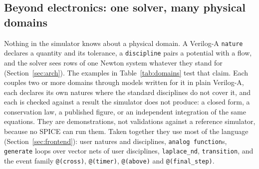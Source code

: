 \subsection{Beyond electronics: one solver, many physical domains}
\label{sec:domains}

Nothing in the simulator knows about a physical domain. A Verilog-A \texttt{nature} declares a
quantity and its tolerance, a \texttt{discipline} pairs a potential with a flow, and the solver
sees rows of one Newton system whatever they stand for (Section~\ref{sec:arch}). The
examples in Table~\ref{tab:domains} test that claim. Each couples two or more domains through
models written for it in plain Verilog-A, each declares its own natures where the standard
disciplines do not cover it, and each is checked against a result the simulator does not
produce: a closed form, a conservation law, a published figure, or an independent integration
of the same equations. They are demonstrations, not validations against a reference simulator,
because no SPICE can run them. Taken together they use most of the language
(Section~\ref{sec:frontend}): user natures and disciplines, \texttt{analog function}s,
\texttt{generate} loops over vector nets of user disciplines, \texttt{laplace\_nd},
\texttt{transition}, and the event family \texttt{@(cross)}, \texttt{@(timer)},
\texttt{@(above)} and \texttt{@(final\_step)}.

